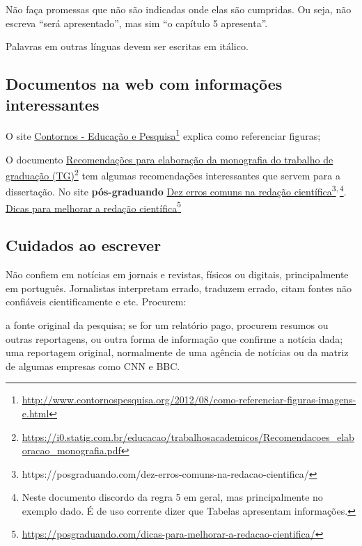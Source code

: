 \documentclass{article}
\begin{document}
 Não faça promessas que não são indicadas onde elas são cumpridas. Ou seja, não escreva ``será apresentado'', mas sim ``o capítulo 5 apresenta''.

Palavras em outras línguas devem ser escritas em itálico.



\subsection{Documentos na web com informações interessantes}

\begin{outline}
\1 O site \href{http://www.contornospesquisa.org/2012/08/como-referenciar-figuras-imagens-e.html}{Contornos - Educação e Pesquisa}\footnote{\url{http://www.contornospesquisa.org/2012/08/como-referenciar-figuras-imagens-e.html}} explica como referenciar figuras;

\1 O documento \href{https://i0.statig.com.br/educacao/trabalhosacademicos/Recomendacoes_elaboracao_monografia.pdf}{Recomendações para elaboração da monografia do trabalho de graduação (TG)}\footnote{\url{https://i0.statig.com.br/educacao/trabalhosacademicos/Recomendacoes_elaboracao_monografia.pdf}} tem algumas recomendações interessantes que servem para a dissertação.
\1 No site \textbf{pós-graduando}
\2 \href{https://posgraduando.com/dez-erros-comuns-na-redacao-cientifica/}{Dez erros comuns na redação científica}\footnote{https://posgraduando.com/dez-erros-comuns-na-redacao-cientifica/}\textsuperscript{,\,}\footnote{Neste documento discordo da regra 5 em geral, mas principalmente no exemplo dado. É de uso corrente dizer que Tabelas apresentam informações.}. 
\2 \href{https://posgraduando.com/dicas-para-melhorar-a-redacao-cientifica/}{Dicas para melhorar a redação científica}\footnote{\url{https://posgraduando.com/dicas-para-melhorar-a-redacao-cientifica/}}
\end{outline}

\subsection{Cuidados ao escrever}

Não confiem em notícias em jornais e revistas, físicos ou digitais, principalmente em português. Jornalistas interpretam errado, traduzem errado, citam fontes não confiáveis cientificamente e etc.
Procurem:
\begin{outline}
    \1 a fonte original da pesquisa;
    \2 se for um relatório pago, procurem resumos ou outras reportagens, ou outra forma de informação que confirme a notícia dada;
    \1 uma reportagem original, normalmente de uma agência de notícias ou da matriz de algumas empresas como CNN e BBC.
\end{outline}
\end{document}
